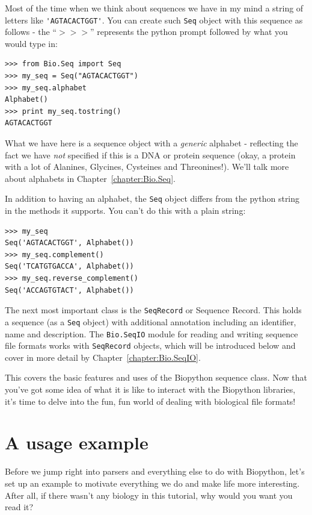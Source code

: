 \documentclass{report}
\begin{document}
Most of the time when we think about sequences we have in my mind a string of letters like \verb|'AGTACACTGGT'|. You can create such \verb|Seq| object with this sequence as follows - the ``$>>>$'' represents the python prompt followed by what you would type in:

\begin{verbatim}
>>> from Bio.Seq import Seq
>>> my_seq = Seq("AGTACACTGGT")
>>> my_seq.alphabet
Alphabet()
>>> print my_seq.tostring()
AGTACACTGGT
\end{verbatim}

What we have here is a sequence object with a \emph{generic} alphabet - reflecting the fact we have \emph{not} specified if this is a DNA or protein sequence (okay, a protein with a lot of Alanines, Glycines, Cysteines and Threonines!).  We'll talk more about alphabets in Chapter~\ref{chapter:Bio.Seq}.

In addition to having an alphabet, the \verb|Seq| object differs from the python string in the methods it supports.  You can't do this with a plain string:

\begin{verbatim}
>>> my_seq
Seq('AGTACACTGGT', Alphabet())
>>> my_seq.complement()
Seq('TCATGTGACCA', Alphabet())
>>> my_seq.reverse_complement()
Seq('ACCAGTGTACT', Alphabet())
\end{verbatim}

The next most important class is the \verb|SeqRecord| or Sequence Record.  This holds a sequence (as a \verb|Seq| object) with additional annotation including an identifier, name and description.  The \verb|Bio.SeqIO| module for reading and writing sequence file formats works with \verb|SeqRecord| objects, which will be introduced below and cover in more detail by Chapter~\ref{chapter:Bio.SeqIO}.

This covers the basic features and uses of the Biopython sequence class.
Now that you've got some idea of what it is like to interact with the Biopython libraries, it's time to delve into the fun, fun world of dealing with biological file formats!

\section{A usage example}
\label{sec:orchids}

Before we jump right into parsers and everything else to do with Biopython, let's set up an example to motivate everything we do and make life more interesting. After all, if there wasn't any biology in this tutorial, why would you want you read it?
\end{document}
